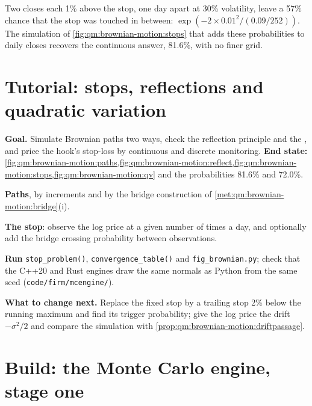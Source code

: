 Two closes each 1\% above the stop, one day apart at 30\% volatility, leave a 57\%
chance that the stop was touched in between: $\exp(-2 \times 0.01^2/(0.09/252))$. The
simulation of \cref{fig:qm:brownian-motion:stops} that adds these probabilities to daily
closes recovers the continuous answer, 81.6\%, with no finer grid.

\section{Tutorial: stops, reflections and quadratic variation}\label{tut:qm:brownian-motion:stops}

\begin{tutorial}
\textbf{Goal.} Simulate Brownian paths two ways, check the reflection principle and the
, and price the hook's stop-loss by continuous and discrete monitoring.
\textbf{End state:} \cref{fig:qm:brownian-motion:paths,fig:qm:brownian-motion:reflect,fig:qm:brownian-motion:stops,fig:qm:brownian-motion:qv}
and the probabilities 81.6\% and 72.0\%.
\begin{tutsteps}
\item \textbf{Paths}, by increments and by the bridge construction of \cref{met:qm:brownian-motion:bridge}(i).
\label{lst:qm:brownian-motion:bridge}
\item \textbf{The stop}: observe the log price at a given number of times a day, and
optionally add the bridge crossing probability between observations.
\label{lst:qm:brownian-motion:touch}
\item \textbf{Run} \texttt{stop\_problem()}, \texttt{convergence\_table()} and
\texttt{fig\_brownian.py}; check that the C++20 and Rust engines draw the same normals as
Python from the same seed (\texttt{code/firm/mcengine/}).
\end{tutsteps}
\textbf{What to change next.} Replace the fixed stop by a trailing stop 2\% below the running
maximum and find its trigger probability; give the log price the drift $-\sigma^2/2$ and
compare the simulation with \cref{prop:qm:brownian-motion:driftpassage}.
\end{tutorial}

\section{Build: the Monte Carlo engine, stage one}\label{bld:qm:brownian-motion:mcengine}

